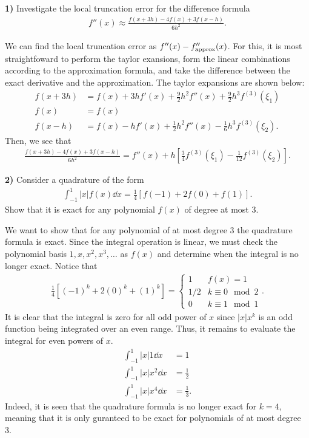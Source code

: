 \documentclass[12pt,a4paper]{article}
\newcommand{\prob}[2]{\textbf{#1)} #2}
\begin{document}
\prob{1}{
Investigate the local truncation error for the difference formula
\begin{align*}
    f''(x) \approx \frac{f(x+3h) - 4f(x) + 3f(x-h)}{6h^2}
.\end{align*}
}

We can find the local truncation error as $f''(x) - f''_{\rm approx}(x)$.
For this, it is most straightfoward to perform the taylor exansions, form the linear combinations according to the approximation formula, and take the difference between the exact derivative and the approximation.
The taylor expansions are shown below:
\begin{align*}
    f(x+3h) &= f(x) + 3hf'(x) + \frac{9}{2} h^2 f''(x) + \frac{9}{2}h^3f^{(3)}(\xi_1)\\
    f(x) &= f(x) \\
    f(x - h) &= f(x) - hf'(x) + \frac{1}{2}h^2f''(x) - \frac{1}{6}h^3f^{(3)}(\xi_2)
.\end{align*}
Then, we see that 
\begin{align*}
    \frac{f(x+3h) - 4f(x) + 3f(x-h)}{6h^2} = f''(x) + h\left[  \frac{3}{4}f^{(3)}(\xi_1) - \frac{1}{12}f^{(3)}(\xi_2) \right]
.\end{align*}

\prob{2}{
Consider a quadrature of the form
\begin{align*}
    \int_{-1}^{1} \left| x \right| f(x) \dd{x} = \frac{1}{4} \left[ f(-1) + 2f(0) + f(1) \right]
.\end{align*}
Show that it is exact for any polynomial $f(x)$ of degree at most 3.
}

We want to show that for any polynomial of at most degree 3 the quadrature formula is exact.
Since the integral operation is linear, we must check the polynomial basis $1,x,x^2,x^3,\ldots$ as $f(x)$ and determine when the integral is no longer exact.
Notice that
\begin{align*}
    \frac{1}{4}\left[ (-1)^{k} + 2(0)^{k} + (1)^{k} \right] = 
    \begin{cases}
        1 & f(x) = 1 \\
        1/2 & k \equiv 0 \mod{2} \\
        0 & k \equiv 1 \mod{1}
    \end{cases}
.\end{align*}
It is clear that the integral is zero for all odd power of $x$ since $\left| x \right|x^{k}$ is an odd function being integrated over an even range.
Thus, it remains to evaluate the integral for even powers of $x$.
\begin{align*}
    \int_{-1}^{1} \left| x \right|1 \dd{x} &= 1 \\
    \int_{-1}^{1} \left| x \right|x^2 \dd{x} &= \frac{1}{2} \\
    \int_{-1}^{1} \left| x \right|x^{4} \dd{x} &= \frac{1}{3}
.\end{align*}
Indeed, it is seen that the quadrature formula is no longer exact for $k = 4$, meaning that it is only guranteed to be exact for polynomials of at most degree 3.
\end{document}

